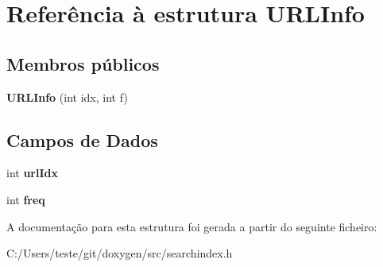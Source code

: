 \hypertarget{struct_u_r_l_info}{\section{Referência à estrutura U\-R\-L\-Info}
\label{struct_u_r_l_info}
}
\subsection*{Membros públicos}
\begin{DoxyCompactItemize}
\item 
\hypertarget{struct_u_r_l_info_afdbe9d4fc0c2faf03907a6d10bae2aa1}{{\bfseries U\-R\-L\-Info} (int idx, int f)}\label{struct_u_r_l_info_afdbe9d4fc0c2faf03907a6d10bae2aa1}

\end{DoxyCompactItemize}
\subsection*{Campos de Dados}
\begin{DoxyCompactItemize}
\item 
\hypertarget{struct_u_r_l_info_a86843a8436679222da2130e549134ed5}{int {\bfseries url\-Idx}}\label{struct_u_r_l_info_a86843a8436679222da2130e549134ed5}

\item 
\hypertarget{struct_u_r_l_info_ae0d22272b68e75d19ac0b80c01f806b6}{int {\bfseries freq}}\label{struct_u_r_l_info_ae0d22272b68e75d19ac0b80c01f806b6}

\end{DoxyCompactItemize}


A documentação para esta estrutura foi gerada a partir do seguinte ficheiro\-:\begin{DoxyCompactItemize}
\item 
C\-:/\-Users/teste/git/doxygen/src/searchindex.\-h\end{DoxyCompactItemize}
